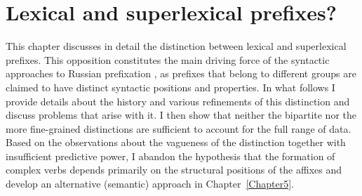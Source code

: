 
\chapter{Lexical and superlexical prefixes?} 
\label{Chapter4}

This chapter discusses in detail the distinction between lexical and superlexical prefixes. This opposition constitutes the main driving force of the syntactic approaches to Russian prefixation \citep[][among others]{Ramchand:04, Svenonius:04b, Romanova:06}, as prefixes that belong to different groups are claimed to have distinct syntactic positions and properties. In what follows I provide details about the history and various refinements of this distinction and discuss problems that arise with it. I then show that neither the bipartite nor the more fine-grained distinctions are sufficient to account for the full range of data. Based on the observations about the vagueness of the distinction together with insufficient predictive power, I abandon the hypothesis that the formation of complex verbs depends primarily on the structural positions of the affixes and develop an alternative (semantic) approach in Chapter~\ref{Chapter5}.

